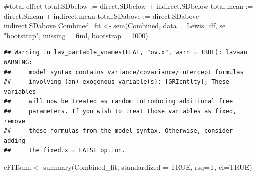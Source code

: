\documentclass[
  english,
]{book}
\newenvironment{Shaded}{\begin{snugshade}}{\end{snugshade}}
\newcommand{\AttributeTok}[1]{\textcolor[rgb]{0.77,0.63,0.00}{#1}}
\newcommand{\ConstantTok}[1]{\textcolor[rgb]{0.00,0.00,0.00}{#1}}
\newcommand{\DecValTok}[1]{\textcolor[rgb]{0.00,0.00,0.81}{#1}}
\newcommand{\FunctionTok}[1]{\textcolor[rgb]{0.00,0.00,0.00}{#1}}
\newcommand{\NormalTok}[1]{#1}
\newcommand{\OtherTok}[1]{\textcolor[rgb]{0.56,0.35,0.01}{#1}}
\newcommand{\StringTok}[1]{\textcolor[rgb]{0.31,0.60,0.02}{#1}}
\begin{document}
\begin{Shaded}
\begin{Highlighting}[]
\StringTok{    \#total effect}
\StringTok{    total.SDbelow := direct.SDbelow + indirect.SDbelow}
\StringTok{    total.mean := direct.Smean + indirect.mean}
\StringTok{    total.SDabove := direct.SDabove + indirect.SDabove}
\StringTok{ \textquotesingle{}}
\NormalTok{Combined\_fit }\OtherTok{\textless{}{-}} \FunctionTok{sem}\NormalTok{(Combined, }\AttributeTok{data =}\NormalTok{ Lewis\_df, }\AttributeTok{se =} \StringTok{"bootstrap"}\NormalTok{, }\AttributeTok{missing =} \StringTok{\textquotesingle{}fiml\textquotesingle{}}\NormalTok{, }\AttributeTok{bootstrap =} \DecValTok{1000}\NormalTok{)}
\end{Highlighting}
\end{Shaded}

\begin{verbatim}
## Warning in lav_partable_vnames(FLAT, "ov.x", warn = TRUE): lavaan WARNING:
##     model syntax contains variance/covariance/intercept formulas
##     involving (an) exogenous variable(s): [GRIcntlty]; These variables
##     will now be treated as random introducing additional free
##     parameters. If you wish to treat those variables as fixed, remove
##     these formulas from the model syntax. Otherwise, consider adding
##     the fixed.x = FALSE option.
\end{verbatim}

\begin{Shaded}
\begin{Highlighting}[]
\NormalTok{cFITsum }\OtherTok{\textless{}{-}} \FunctionTok{summary}\NormalTok{(Combined\_fit, }\AttributeTok{standardized =} \ConstantTok{TRUE}\NormalTok{, }\AttributeTok{rsq=}\NormalTok{T, }\AttributeTok{ci=}\ConstantTok{TRUE}\NormalTok{)    }
\end{Highlighting}
\end{Shaded}
\end{document}
